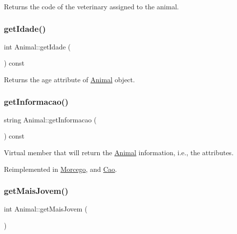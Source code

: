 Returns the code of the veterinary assigned to the animal. \mbox{\label{class_animal_aff6bba590691cc405b5641d1b071dcd5}} 
\subsubsection{\texorpdfstring{get\+Idade()}{getIdade()}}
{\footnotesize\ttfamily int Animal\+::get\+Idade (\begin{DoxyParamCaption}{ }\end{DoxyParamCaption}) const}

Returns the age attribute of \mbox{\hyperlink{class_animal}{Animal}} object. \mbox{\label{class_animal_aee82faf16789092dc1fde106382e2b18}} 
\subsubsection{\texorpdfstring{get\+Informacao()}{getInformacao()}}
{\footnotesize\ttfamily string Animal\+::get\+Informacao (\begin{DoxyParamCaption}{ }\end{DoxyParamCaption}) const\hspace{0.3cm}{\ttfamily [virtual]}}

Virtual member that will return the \mbox{\hyperlink{class_animal}{Animal}} information, i.\+e., the attributes. 

Reimplemented in \mbox{\hyperlink{class_morcego_a8dd752e35a5e37bda4d27b0eeb72912b}{Morcego}}, and \mbox{\hyperlink{class_cao_a5b2e5aff66f0c8a9076ef559c3862292}{Cao}}.

\mbox{\label{class_animal_a8d0b4ade587dd11205668b8caf2bce87}} 
\subsubsection{\texorpdfstring{get\+Mais\+Jovem()}{getMaisJovem()}}
{\footnotesize\ttfamily int Animal\+::get\+Mais\+Jovem (\begin{DoxyParamCaption}{ }\end{DoxyParamCaption})\hspace{0.3cm}{\ttfamily [static]}}

